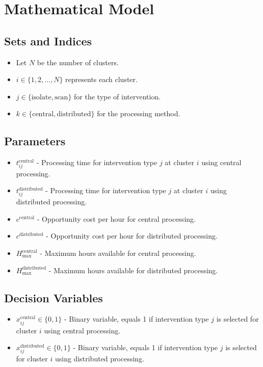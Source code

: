 \documentclass{article}
\begin{document}
\section*{Mathematical Model}

\subsection*{Sets and Indices}
\begin{itemize}
    \item Let $N$ be the number of clusters.
    \item $i \in \{1, 2, \ldots, N\}$ represents each cluster.
    \item $j \in \{\text{isolate}, \text{scan}\}$ for the type of intervention.
    \item $k \in \{\text{central}, \text{distributed}\}$ for the processing method.
\end{itemize}

\subsection*{Parameters}
\begin{itemize}
    \item $t_{ij}^{\text{central}}$ - Processing time for intervention type $j$ at cluster $i$ using central processing.
    \item $t_{ij}^{\text{distributed}}$ - Processing time for intervention type $j$ at cluster $i$ using distributed processing.
    \item $c^{\text{central}}$ - Opportunity cost per hour for central processing.
    \item $c^{\text{distributed}}$ - Opportunity cost per hour for distributed processing.
    \item $H^{\text{central}}_{\max}$ - Maximum hours available for central processing.
    \item $H^{\text{distributed}}_{\max}$ - Maximum hours available for distributed processing.
\end{itemize}

\subsection*{Decision Variables}
\begin{itemize}
    \item $x_{ij}^{\text{central}} \in \{0, 1\}$ - Binary variable, equals 1 if intervention type $j$ is selected for cluster $i$ using central processing.
    \item $x_{ij}^{\text{distributed}} \in \{0, 1\}$ - Binary variable, equals 1 if intervention type $j$ is selected for cluster $i$ using distributed processing.
\end{itemize}
\end{document}
